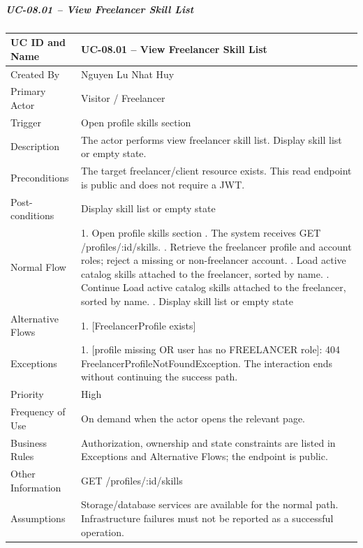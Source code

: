 \subparagraph{UC-08.01 -- View Freelancer Skill List}
{\singlespacing\small
\begin{longtable}{|L{3.2cm}|L{11.1cm}|}\hline
UC ID and Name & UC-08.01 -- View Freelancer Skill List \\ \hline
Created By & Nguyen Lu Nhat Huy \\ \hline
Primary Actor & Visitor /\allowbreak{} Freelancer \\ \hline
Trigger & Open profile skills section \\ \hline
Description & The actor performs view freelancer skill list. Display skill list or empty state. \\ \hline
Preconditions & The target freelancer/\allowbreak{}client resource exists. This read endpoint is public and does not require a JWT. \\ \hline
Post-conditions & Display skill list or empty state \\ \hline
Normal Flow & 1. Open profile skills section . The system receives GET /\allowbreak{}profiles/\allowbreak{}:id/\allowbreak{}skills. . Retrieve the freelancer profile and account roles; reject a missing or non-freelancer account. . Load active catalog skills attached to the freelancer, sorted by name. . Continue Load active catalog skills attached to the freelancer, sorted by name. . Display skill list or empty state \\ \hline
Alternative Flows & 1. [Freelancer\allowbreak{}Profile exists] \\ \hline
Exceptions & 1. [profile missing OR user has no FREELANCER role]: 404 Freelancer\allowbreak{}Profile\allowbreak{}Not\allowbreak{}Found\allowbreak{}Exception. The interaction ends without continuing the success path. \\ \hline
Priority & High \\ \hline
Frequency of Use & On demand when the actor opens the relevant page. \\ \hline
Business Rules & Authorization, ownership and state constraints are listed in Exceptions and Alternative Flows; the endpoint is public. \\ \hline
Other Information & GET /\allowbreak{}profiles/\allowbreak{}:id/\allowbreak{}skills \\ \hline
Assumptions & Storage/\allowbreak{}database services are available for the normal path. Infrastructure failures must not be reported as a successful operation. \\ \hline
\end{longtable}}

